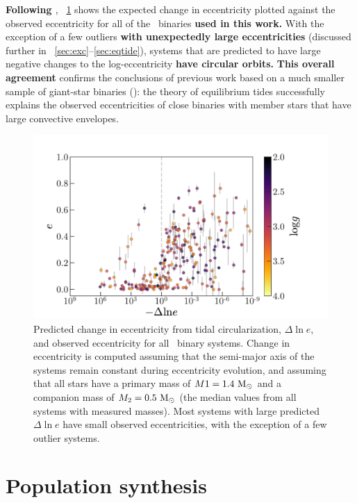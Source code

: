 \documentclass[modern, letterpaper]{aastex62}
\newcommand{\apogee}{\project{\acronym{APOGEE}}}
\renewcommand{\changes}[1]{\textbf{#1}}
\begin{document}
\changes{Following \citet{Verbunt:1995}}, \figurename~\ref{fig:dlne} shows the expected change in eccentricity plotted against the observed eccentricity for all of the \apogee\ binaries \changes{used in this work.}
With the exception of a few outliers \changes{with unexpectedly large eccentricities} (discussed further in \sectionname~\ref{sec:exc}--\ref{sec:eqtide}), systems that are predicted to have large negative changes to the log-eccentricity \changes{have circular orbits.}
\changes{This overall agreement} confirms the conclusions of previous work based on a much smaller sample of giant-star binaries (\citealt{Verbunt:1995}): the theory of equilibrium tides successfully explains the observed eccentricities of close binaries with member stars that have large convective envelopes.

\begin{figure}[h]
\begin{center}
\includegraphics[width=\textwidth]{dlne}
\end{center}
\caption{%
Predicted change in eccentricity from tidal circularization, $\Delta \ln e$, and
observed eccentricity for all \apogee\ binary systems.
Change in eccentricity is computed assuming that the semi-major axis of the
systems remain constant during eccentricity evolution, and assuming that all
stars have a primary mass of $M1 = 1.4~\mathrm{M}_\odot$ and a companion mass of $M_2 =
0.5~\mathrm{M}_\odot$ (the median values from all systems with measured masses).
Most systems with large predicted $\Delta\ln e$ have small observed
eccentricities, with the exception of a few outlier systems.
\label{fig:dlne}
}
\end{figure}


\section{Population synthesis}
\label{sec:theory}
\end{document}
